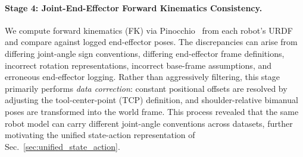 
\paragraph{Stage 4: Joint-End-Effector Forward Kinematics Consistency.}
We compute forward kinematics (FK) via Pinocchio~\citep{carpentier2019pinocchio} from each robot's URDF and compare against logged end-effector poses. The discrepancies can arise from differing joint-angle sign conventions, differing end-effector frame definitions, incorrect rotation representations, incorrect base-frame assumptions, and erroneous end-effector logging. Rather than aggressively filtering, this stage primarily performs \emph{data correction}: constant positional offsets are resolved by adjusting the tool-center-point (TCP) definition, and shoulder-relative bimanual poses are transformed into the world frame. This process revealed that the same robot model can carry different joint-angle conventions across datasets, further motivating the unified state-action representation of Sec.~\ref{sec:unified_state_action}.

